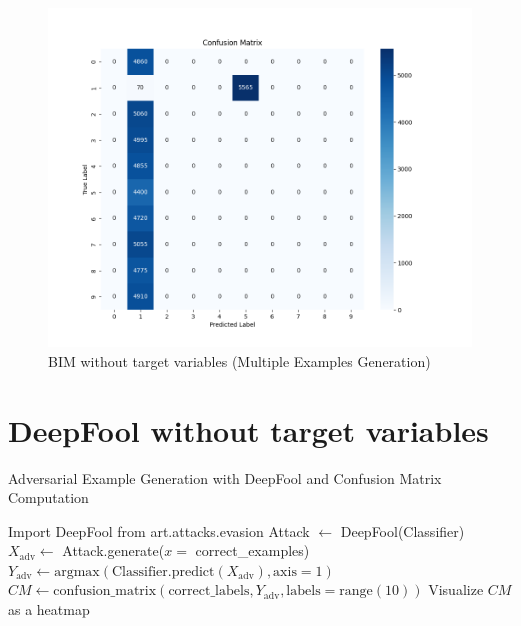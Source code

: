 \documentclass[11pt,onside]{article}
\begin{document}
\begin{figure}[h]
\centering
\includegraphics[width=1\textwidth]{V1_images/mul_BIM_with_target.png}
\caption{BIM without target variables (Multiple Examples Generation)}
\label{fig: BIM without target variables (Multiple Examples Generation)}
\end{figure}


\section{DeepFool without target variables}

\begin{algorithm}[H]
\caption{Adversarial Example Generation with DeepFool and Confusion Matrix Computation}
\begin{algorithmic}[1]
\State Import DeepFool from art.attacks.evasion
\State Attack $\gets$ DeepFool(Classifier)
\State $X_{\text{adv}} \gets$ Attack.generate($x=$ correct\_examples)
\State $Y_{\text{adv}} \gets \text{argmax}(\text{Classifier.predict}(X_{\text{adv}}), \text{axis}=1)$
\State $CM \gets \text{confusion\_matrix}(\text{correct\_labels}, Y_{\text{adv}}, \text{labels}=\text{range}(10))$
\State Visualize $CM$ as a heatmap
\end{algorithmic}
\end{algorithm}
\end{document}

